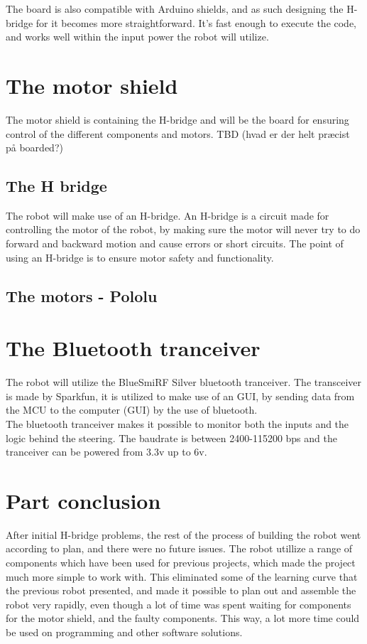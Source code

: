 The board is also compatible with Arduino shields, and as such designing the H-bridge for it
becomes more straightforward. It's fast enough to execute the code, and works well within the
input power the robot will utilize.

\section{The motor shield}
The motor shield is containing the H-bridge and will be the board for ensuring control of the different components and motors.
TBD (hvad er der helt præcist på boarded?)

\subsection{The H bridge}
The robot will make use of an H-bridge. An H-bridge is a circuit made for controlling the motor of the robot, by making sure the motor will never try to do forward and backward motion  and cause errors or short circuits. The point of using an H-bridge is to ensure motor safety and functionality.

\subsection{The motors - Pololu}

\section{The Bluetooth tranceiver}
The robot will utilize the BlueSmiRF Silver bluetooth tranceiver. The transceiver is made by Sparkfun, it is utilized to make use of an GUI, by sending data from the MCU to the computer (GUI) by the use of bluetooth.\\ The bluetooth tranceiver makes it possible to monitor both the inputs and the logic behind the steering. The baudrate is between 2400-115200 bps and the tranceiver can be powered from 3.3v up to 6v. 

\section{Part conclusion}
After initial H-bridge problems, the rest of the process of building the robot went according to plan, and there were no future issues. The robot utillize a range of components which have been used for previous projects, which made the project much more simple to work with. This eliminated some of the learning curve that the previous robot presented, and made it possible to plan out and assemble the robot very rapidly, even though a lot of time was spent waiting for components for the motor shield, and the faulty components. This way, a lot more time could be used on programming and other software solutions. 
